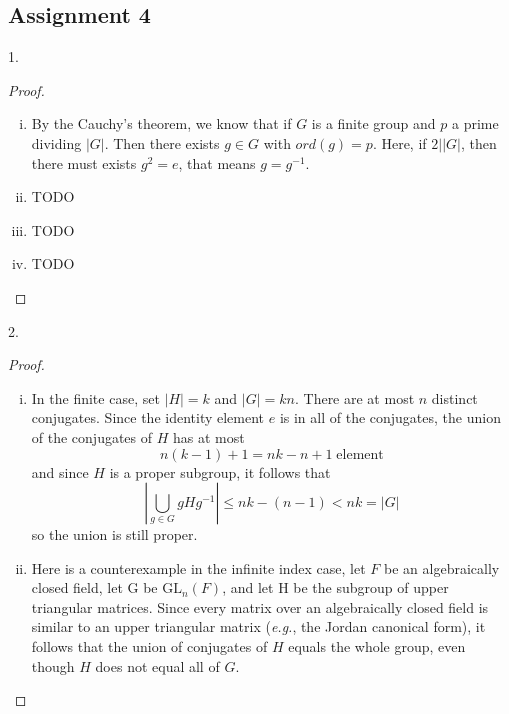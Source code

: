 \subsection{Assignment 4}

\begin{exercise}
    1.
\end{exercise}

\begin{proof}
    \begin{enumerate}[(i)]
        \item By the Cauchy's theorem, we know that if $G$ is a finite group and $p$ a prime dividing $|G|$. Then there exists $g\in G$ with $ord(g)=p$. Here, if $2| |G|$, then there must exists $g^2=e$, that means $g=g^{-1}$.
        \item TODO
        \item TODO
        \item TODO
    \end{enumerate}
\end{proof}


\begin{exercise}
    2.
\end{exercise}

\begin{proof}
    \begin{enumerate}[(i)]
        \item In the finite case, set $|H|=k$ and $|G|=kn$. There are at most $n$ distinct conjugates. Since the identity element $e$ is in all of the conjugates, the union of the conjugates of $H$ has at most
        $$n(k-1)+1=nk-n+1\; \text{element}$$
        and since $H$ is a proper subgroup, it follows that
        $$
        \left|\bigcup_{g \in G} g H g^{-1}\right| \leq n k-(n-1)<n k=|G|
        $$
        so the union is still proper.
        \item Here is a counterexample in the infinite index case, let $F$ be an algebraically closed field, let G be $\mathrm{GL}_n(F)$, and let H be the subgroup of upper triangular matrices. Since every matrix over an algebraically closed field is similar to an upper triangular matrix (\textit{e.g.}, the Jordan canonical form), it follows that the union of conjugates of $H$ equals the whole group, even though $H$ does not equal all of $G$.
    \end{enumerate}
\end{proof}


